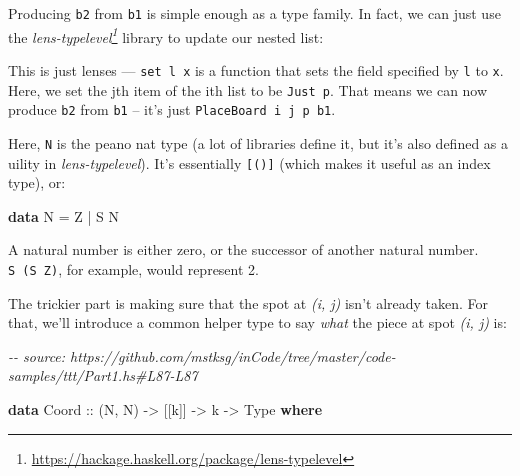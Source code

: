 \documentclass[]{article}
\newenvironment{Shaded}{}{}
\newcommand{\CommentTok}[1]{\textcolor[rgb]{0.38,0.63,0.69}{\textit{#1}}}
\newcommand{\DataTypeTok}[1]{\textcolor[rgb]{0.56,0.13,0.00}{#1}}
\newcommand{\KeywordTok}[1]{\textcolor[rgb]{0.00,0.44,0.13}{\textbf{#1}}}
\newcommand{\NormalTok}[1]{#1}
\newcommand{\OperatorTok}[1]{\textcolor[rgb]{0.40,0.40,0.40}{#1}}
\newcommand{\OtherTok}[1]{\textcolor[rgb]{0.00,0.44,0.13}{#1}}
\renewcommand{\href}[2]{#2\footnote{\url{#1}}}
\begin{document}
Producing \texttt{b2} from \texttt{b1} is simple enough as a type family. In
fact, we can just use the
\emph{\href{https://hackage.haskell.org/package/lens-typelevel}{lens-typelevel}}
library to update our nested list:

\begin{Shaded}
\end{Shaded}

This is just lenses --- \texttt{set\ l\ x} is a function that sets the field
specified by \texttt{l} to \texttt{x}. Here, we set the jth item of the ith list
to be \texttt{Just\ p}. That means we can now produce \texttt{b2} from
\texttt{b1} -- it's just \texttt{PlaceBoard\ i\ j\ p\ b1}.

Here, \texttt{N} is the peano nat type (a lot of libraries define it, but it's
also defined as a uility in \emph{lens-typelevel}). It's essentially
\texttt{{[}(){]}} (which makes it useful as an index type), or:

\begin{Shaded}
\begin{Highlighting}[]
\KeywordTok{data} \DataTypeTok{N} \OtherTok{=} \DataTypeTok{Z} \OperatorTok{|} \DataTypeTok{S} \DataTypeTok{N}
\end{Highlighting}
\end{Shaded}

A natural number is either zero, or the successor of another natural number.
\texttt{S\ (S\ Z)}, for example, would represent 2.

The trickier part is making sure that the spot at \emph{(i, j)} isn't already
taken. For that, we'll introduce a common helper type to say \emph{what} the
piece at spot \emph{(i, j)} is:

\begin{Shaded}
\begin{Highlighting}[]
\CommentTok{{-}{-} source: https://github.com/mstksg/inCode/tree/master/code{-}samples/ttt/Part1.hs\#L87{-}L87}

\KeywordTok{data} \DataTypeTok{Coord}\OtherTok{ ::}\NormalTok{ (}\DataTypeTok{N}\NormalTok{, }\DataTypeTok{N}\NormalTok{) }\OtherTok{{-}\textgreater{}}\NormalTok{ [[k]] }\OtherTok{{-}\textgreater{}}\NormalTok{ k }\OtherTok{{-}\textgreater{}} \DataTypeTok{Type} \KeywordTok{where}
\end{Highlighting}
\end{Shaded}
\end{document}
